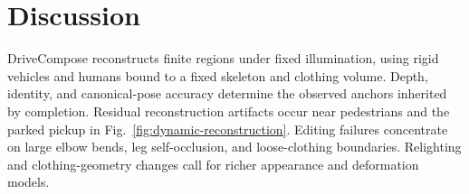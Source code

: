 \section{Discussion}
\label{sec:discussion}

DriveCompose reconstructs finite regions under fixed illumination, using rigid vehicles and humans bound to a fixed skeleton and clothing volume. Depth, identity, and canonical-pose accuracy determine the observed anchors inherited by completion. Residual reconstruction artifacts occur near pedestrians and the parked pickup in Fig.~\ref{fig:dynamic-reconstruction}. Editing failures concentrate on large elbow bends, leg self-occlusion, and loose-clothing boundaries. Relighting and clothing-geometry changes call for richer appearance and deformation models.
